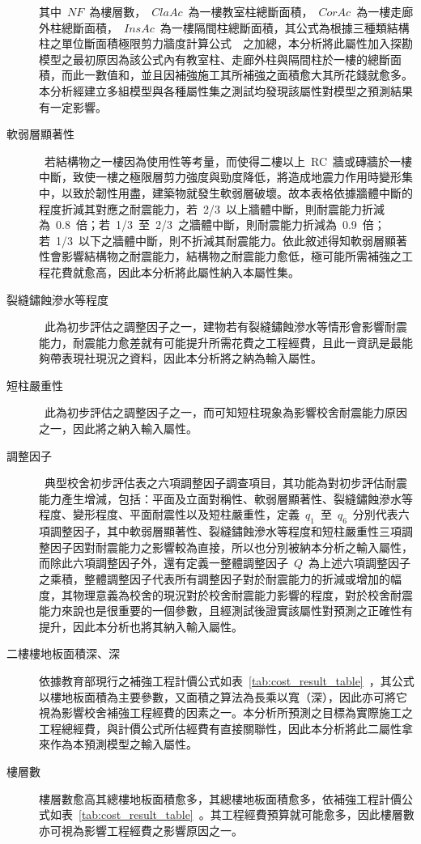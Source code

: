 \begin{description}
  其中~$NF$~為樓層數，~$ClaAc$~為一樓教室柱總斷面積，~$CorAc$~為一樓走廊外柱總斷面積，~$InsAc$~為一樓隔間柱總斷面積，其公式為根據三種類結構柱之單位斷面積極限剪力牆度計算公式~\cite{su2008master}~之加總，本分析將此屬性加入探勘模型之最初原因為該公式內有教室柱、走廊外柱與隔間柱於一樓的總斷面積，而此一數值和，並且因補強施工其所補強之面積愈大其所花錢就愈多。本分析經建立多組模型與各種屬性集之測試均發現該屬性對模型之預測結果有一定影響。
  \item[軟弱層顯著性]
  \cite{ncree03049}~若結構物之一樓因為使用性等考量，而使得二樓以上~RC~牆或磚牆於一樓中斷，致使一樓之極限層剪力強度與勁度降低，將造成地震力作用時變形集中，以致於韌性用盡，建築物就發生軟弱層破壞。故本表格依據牆體中斷的程度折減其對應之耐震能力，若~2/3~以上牆體中斷，則耐震能力折減為~0.8~倍；若~1/3~至~2/3~之牆體中斷，則耐震能力折減為~0.9~倍；若~1/3~以下之牆體中斷，則不折減其耐震能力。依此敘述得知軟弱層顯著性會影響結構物之耐震能力，結構物之耐震能力愈低，極可能所需補強之工程花費就愈高，因此本分析將此屬性納入本屬性集。
  \item[裂縫鏽蝕滲水等程度]
  \cite{ncree03049}~此為初步評估之調整因子之一，建物若有裂縫鏽蝕滲水等情形會影響耐震能力，耐震能力愈差就有可能提升所需花費之工程經費，且此一資訊是最能夠帶表現社現況之資料，因此本分析將之納為輸入屬性。
  \item[短柱嚴重性]
  \cite{ncree03049}~此為初步評估之調整因子之一，而可知短柱現象為影響校舍耐震能力原因之一，因此將之納入輸入屬性。
  \item[調整因子]
  \cite{ncree03049}~典型校舍初步評估表之六項調整因子調查項目，其功能為對初步評估耐震能力產生增減，包括：平面及立面對稱性、軟弱層顯著性、裂縫鏽蝕滲水等程度、變形程度、平面耐震性以及短柱嚴重性，定義~$q_1$~至~$q_6$~分別代表六項調整因子，其中軟弱層顯著性、裂縫鏽蝕滲水等程度和短柱嚴重性三項調整因子因對耐震能力之影響較為直接，所以也分別被納本分析之輸入屬性，而除此六項調整因子外，還有定義一整體調整因子~$Q$~為上述六項調整因子之乘積，整體調整因子代表所有調整因子對於耐震能力的折減或增加的幅度，其物理意義為校舍的現況對於校舍耐震能力影響的程度，對於校舍耐震能力來說也是很重要的一個參數，且經測試後證實該屬性對預測之正確性有提升，因此本分析也將其納入輸入屬性。
  \item[二樓樓地板面積深、深]
  依據教育部現行之補強工程計價公式如表~\ref{tab:cost_result_table}~，其公式以樓地板面積為主要參數，又面積之算法為長乘以寬（深），因此亦可將它視為影響校舍補強工程經費的因素之一。本分析所預測之目標為實際施工之工程總經費，與計價公式所估經費有直接關聯性，因此本分析將此二屬性拿來作為本預測模型之輸入屬性。
  \item[樓層數]
  樓層數愈高其總樓地板面積愈多，其總樓地板面積愈多，依補強工程計價公式如表~\ref{tab:cost_result_table}~。其工程經費預算就可能愈多，因此樓層數亦可視為影響工程經費之影響原因之一。

\end{description}
